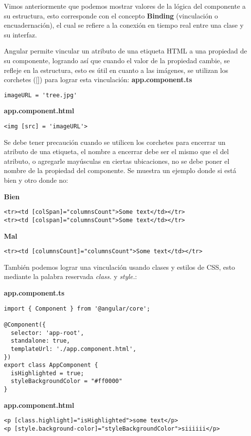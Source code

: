 Vimos anteriormente que podemos mostrar valores de la lógica del componente a su estructura, esto corresponde con el concepto \textbf{Binding} (vinculación o encuadernación), el cual se refiere a la conexión en tiempo real entre una clase y su interfaz.

Angular permite vincular un atributo de una etiqueta HTML a una propiedad de su componente, logrando así que cuando el valor de la propiedad cambie, se refleje en la estructura, esto es útil en cuanto a las imágenes, se utilizan los corchetes ([]) para lograr esta vinculación:
\textbf{app.component.ts}
\begin{lstlisting}[style=htmlcssjs]
imageURL = 'tree.jpg'
\end{lstlisting}

\textbf{app.component.html}
\begin{lstlisting}[style=htmlcssjs]
<img [src] = 'imageURL'>
\end{lstlisting}

Se debe tener precaución cuando se utilicen los corchetes para encerrar un atributo de una etiqueta, el nombre a encerrar debe ser el mismo que el del atributo, o agregarle mayúsculas en ciertas ubicaciones, no se debe poner el nombre de la propiedad del componente. Se muestra un ejemplo donde si está bien y otro donde no:

\textbf{Bien}
\begin{lstlisting}[style=htmlcssjs]
<tr><td [colSpan]="columnsCount">Some text</td></tr>
<tr><td [colspan]="columnsCount">Some text</td></tr>
\end{lstlisting}

\textbf{Mal}
\begin{lstlisting}[style=htmlcssjs]
<tr><td [columnsCount]="columnsCount">Some text</td></tr>
\end{lstlisting}

También podemos lograr una vinculación usando clases y estilos de CSS, esto mediante la palabra reservada \textit{class.} y \textit{style.}:

\textbf{app.component.ts}
\begin{lstlisting}[style=htmlcssjs]
import { Component } from '@angular/core';

@Component({
  selector: 'app-root',
  standalone: true,
  templateUrl: './app.component.html',
})
export class AppComponent {
  isHighlighted = true;
  styleBackgroundColor = "#ff0000"
}
\end{lstlisting}

\textbf{app.component.html}
\begin{lstlisting}[style=htmlcssjs]
<p [class.highlight]="isHighlighted">some text</p>
<p [style.background-color]="styleBackgroundColor">siiiiii</p>
\end{lstlisting}

